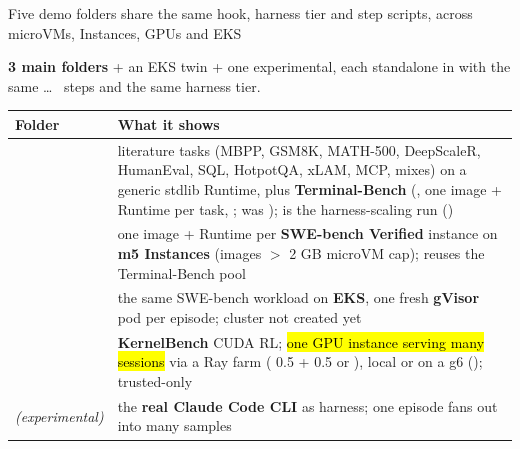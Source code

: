 
\begin{frame}{Five demo folders share the same hook, harness tier and step scripts, across microVMs, Instances, GPUs and EKS}
{\footnotesize\raggedright\textbf{3 main folders} + an EKS twin + one experimental, each standalone in  with the same  \dots\  steps and the same harness tier.\par}
\vspace{1.5mm}
\scriptsize\renewcommand{\arraystretch}{1.12}
\begin{tabularx}{\textwidth}{@{}p{} Y@{}}
\toprule
\textbf{Folder} & \textbf{What it shows}\\
\midrule
{} & literature tasks (MBPP, GSM8K, MATH-500, DeepScaleR, HumanEval, SQL, HotpotQA, xLAM, MCP, mixes) on a generic stdlib Runtime, plus \textbf{Terminal-Bench} (, one image + Runtime per task, ; was );  is the harness-scaling run ()\\
 & one image + Runtime per \textbf{SWE-bench Verified} instance on \textbf{m5 Instances} (images $>$ 2 GB microVM cap); reuses the Terminal-Bench pool\\
 & the same SWE-bench workload on \textbf{EKS}, one fresh \textbf{gVisor} pod per episode; cluster not created yet\\
 & \textbf{KernelBench} CUDA RL; \hl{one GPU instance serving many sessions} via a Ray farm ( 0.5 + 0.5 or ), local or on a g6 (); trusted-only\\
 \textit{(experimental)} & the \textbf{real Claude Code CLI} as harness; one episode fans out into many samples\\
\bottomrule
\end{tabularx}
\end{frame}


